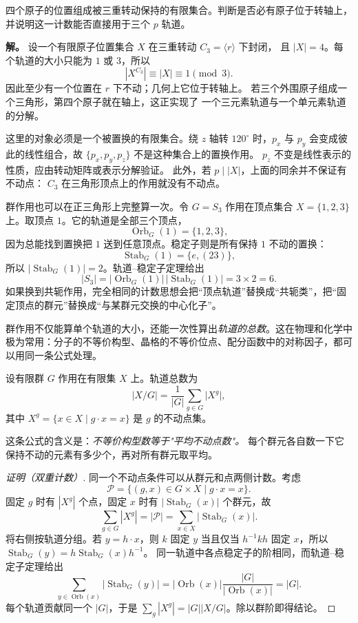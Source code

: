 \begin{example}[{有限位置集合中的对称不动点}]
\label{ex:fixed-point-crystal}
四个原子的位置组成被三重转动保持的有限集合。判断是否必有原子位于转轴上，并说明这一计数能否直接用于三个 $p$ 轨道。

\textbf{解。} 设一个有限原子位置集合 $X$ 在三重转动 $C_3=\langle r\rangle$ 下封闭，
且 $|X|=4$。每个轨道的大小只能为 $1$ 或 $3$，所以
\[
|X^{C_3}|\equiv |X|\equiv1\pmod3.
\]
因此至少有一个位置在 $r$ 下不动；几何上它位于转轴上。
若三个外围原子组成一个三角形，第四个原子就在轴上，这正实现了
一个三元素轨道与一个单元素轨道的分解。

这里的对象必须是一个被置换的有限集合。绕 $z$ 轴转 $120^\circ$
时，$p_x$ 与 $p_y$ 会变成彼此的线性组合，故
$\{p_x,p_y,p_z\}$ 不是这种集合上的置换作用。
$p_z$ 不变是线性表示的性质，应由转动矩阵或表示分解验证。
此外，若 $p\mid |X|$，上面的同余并不保证有不动点：
$C_3$ 在三角形顶点上的作用就没有不动点。
\end{example}

群作用也可以在正三角形上完整算一次。令 $G=S_3$ 作用在顶点集合 $X=\{1,2,3\}$ 上。取顶点 $1$。它的轨道是全部三个顶点，
\[
\operatorname{Orb}_G(1)=\{1,2,3\},
\]
因为总能找到置换把 $1$ 送到任意顶点。稳定子则是所有保持 $1$ 不动的置换：
\[
\operatorname{Stab}_G(1)=\{e,(23)\},
\]
所以 $|\operatorname{Stab}_G(1)|=2$。轨道--稳定子定理给出
\[
|S_3|=|\operatorname{Orb}_G(1)|\,|\operatorname{Stab}_G(1)|=3\times2=6.
\]
如果换到共轭作用，完全相同的计数思想会把“顶点轨道”替换成“共轭类”，把“固定顶点的群元”替换成“与某群元交换的中心化子”。

群作用不仅能算单个轨道的大小，还能一次性算出\emph{轨道的总数}。这在物理和化学中极为常用：分子的不等价构型、晶格的不等价位点、配分函数中的对称因子，都可以用同一条公式处理。

\begin{theorem}[Burnside 引理]
设有限群 $G$ 作用在有限集 $X$ 上。轨道总数为
\[
\lvert X/G\rvert=\frac1{\lvert G\rvert}\sum_{g\in G}\lvert X^g\rvert,
\]
其中 $X^g=\{x\in X\mid g\cdot x=x\}$ 是 $g$ 的不动点集。
\label{thm:burnside}
\end{theorem}

这条公式的含义是：\emph{不等价构型数等于"平均不动点数"。} 每个群元各自数一下它保持不动的元素有多少个，再对所有群元取平均。

\par\medskip
\begin{proof}[证明（双重计数）]
同一个不动点条件可以从群元和点两侧计数。考虑
\[
\mathcal P=\{(g,x)\in G\times X\mid g\cdot x=x\}.
\]
固定 $g$ 时有 $|X^g|$ 个点，固定 $x$ 时有 $|\operatorname{Stab}_G(x)|$ 个群元，故
\[
\sum_{g\in G}|X^g|=|\mathcal P|=\sum_{x\in X}|\operatorname{Stab}_G(x)|.
\]
将右侧按轨道分组。若 $y=h\cdot x$，则 $k$ 固定 $y$ 当且仅当
$h^{-1}kh$ 固定 $x$，所以
$\operatorname{Stab}_G(y)=h\operatorname{Stab}_G(x)h^{-1}$。
同一轨道中各点稳定子的阶相同，而轨道--稳定子定理给出
\[
\sum_{y\in\operatorname{Orb}(x)}|\operatorname{Stab}_G(y)|
=|\operatorname{Orb}(x)|\frac{|G|}{|\operatorname{Orb}(x)|}=|G|.
\]
每个轨道贡献同一个 $|G|$，于是
$\sum_g|X^g|=|G||X/G|$。除以群阶即得结论。
\end{proof}\par\medskip

